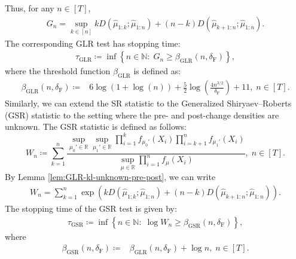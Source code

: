 \documentclass[12pt]{interact}
\newcommand{\lp}{\left(}
\newcommand{\rp}{\right)}
\newcommand{\lb}{\left[}
\newcommand{\rb}{\right]}
\newcommand{\lbp}{\left\{}
\newcommand{\rbp}{\right\}}
\newcommand{\mrm}{\mathrm}
\newcommand{\mbb}{\mathbb}
\theoremstyle{plain}
\begin{document}
Thus, for any $n \in [T]$,
%
\begin{align}
    G_{n} = \sup_{k\in[n]} k D \lp\hat{\mu}_{1:k};\hat{\mu}_{1:n}\rp+\lp n-k\rp D \lp\hat{\mu}_{k+1:n};\hat{\mu}_{1:n}\rp.
\end{align}
%
The corresponding GLR test has stopping time:
%
\begin{align}\label{eq:GLR_tau-pre-post-unknown}
    \tau_{\mrm{GLR}} \coloneqq \inf \lbp n \in \mbb{N}:\; G_{n} \geq \beta_{\mrm{GLR}} \lp n, \delta_{\mathrm{F}} \rp \rbp,
\end{align}
%
where the threshold function $\beta_{\mrm{GLR}}$ is defined as:  
%
\begin{align}\label{eq:GLR_thres-pre-post-unknown}
    \beta_{\mrm{GLR}} \lp n, \delta_{\mathrm{F}} \rp \coloneqq& 6\log\lp1+\log\lp n\rp\rp+\frac{5}{2}\log\lp\frac{4n^{3/2}}{\delta_{\mathrm{F}}}\rp + 11,\; n \in \lb T \rb.
\end{align}
%
Similarly, we can extend the SR statistic to the Generalized Shiryaev–Roberts (GSR) statistic to the setting where the pre- and post-change densities are unknown. The GSR statistic is defined as follows:
%
\begin{equation}\label{eq:GSR_stat_pre-post-unknown}
W_{n} \coloneqq \sum_{k = 1}^{n} \frac{\sup_{\mu_{0}' \in \mbb{R}} \sup_{\mu_{1}' \in \mbb{R}} \prod_{i = 1}^{k} f_{\mu_{0}'} \lp X_{i} \rp \prod_{i = k + 1}^{n} f_{\mu_{1}'}\lp X_{i}\rp}{\sup_{\mu \in \mbb{R}} \prod_{i = 1}^{n} f_{\mu} \lp X_{i} \rp},\; n \in \lb T \rb.
\end{equation}
%
By Lemma \ref{lem:GLR-kl-unknown-pre-post}, we can write
%
\begin{align}
    W_{n} = \sum_{k = 1}^{n} \exp\lp k D \lp\hat{\mu}_{1:k};\hat{\mu}_{1:n}\rp+\lp n-k\rp D \lp\hat{\mu}_{k+1:n};\hat{\mu}_{1:n}\rp \rp.
\end{align}
%
The stopping time of the GSR test is given by:
%
\begin{align}\label{eq:GSR_tau-pre-post-unknown}
    \tau_{\mrm{GSR}} \coloneqq \inf \lbp n \in \mbb{N}:\; \log W_{n} \geq \beta_{\mrm{GSR}} \lp n, \delta_{\mathrm{F}} \rp \rbp,
\end{align}
%
where
%
\begin{align}\label{eq:GSR_thres-pre-post-unknown}
    \beta_{\mrm{GSR}} \lp n, \delta_{\mathrm{F}} \rp \coloneqq& \beta_{\mrm{GLR}} \lp n, \delta_{\mathrm{F}} \rp + \log n,\; n \in \lb T \rb. 
\end{align}
\end{document}
